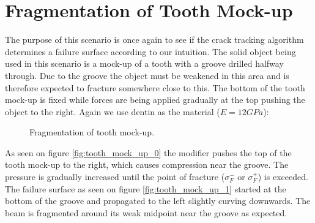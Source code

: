 \section{Fragmentation of Tooth Mock-up}
The purpose of this scenario is once again to see if the crack
tracking algorithm determines a failure surface according to our
intuition. The solid object being used in this scenario is a mock-up
of a tooth with a groove drilled halfway through. Due to the groove
the object must be weakened in this area and is therefore expected to
fracture somewhere close to this. The bottom of the tooth mock-up is fixed
while forces are being applied gradually at the top pushing the object
to the right. Again we use dentin as the material ($E = 12 GPa$):

\begin{figure}
  \begin{minipage}[b]{0.5\linewidth}
    \centering
  \end{minipage}
  \hspace{0.5cm}
  \begin{minipage}[b]{0.5\linewidth}
    \centering
  \end{minipage}
  \caption{Fragmentation of tooth mock-up.}
  \label{fig:tooth_mock_up}
\end{figure}

As seen on figure \vref{fig:tooth_mock_up_0} the modifier pushes the
top of the tooth mock-up to the right, which causes compression near 
the groove. The pressure is gradually increased until the point of
fracture ($\sigma^-_F$ or $\sigma^+_F$) is exceeded. The failure
surface as seen on figure \vref{fig:tooth_mock_up_1} started at the
bottom of the groove and propagated to the left slightly curving
downwards. The beam is fragmented around its weak midpoint near the groove
as expected.    

